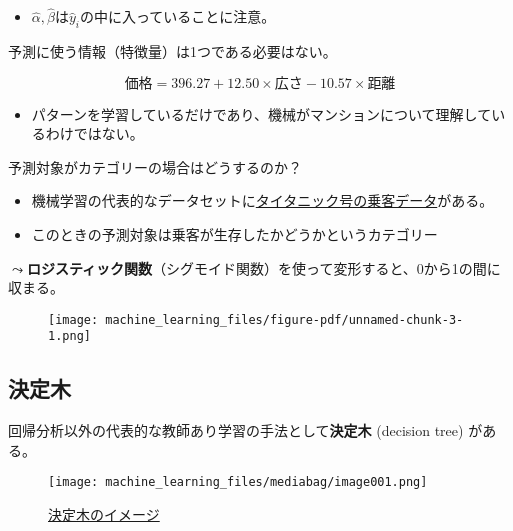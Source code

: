 \documentclass[
  xelatex,
  ja=standard]{bxjsarticle}
\providecommand{\tightlist}{%
  \setlength{\itemsep}{0pt}\setlength{\parskip}{0pt}}\usepackage{longtable,booktabs,array}
\begin{document}
\begin{itemize}
\tightlist
\item
  \(\hat{\alpha}, \hat{\beta}\)は\(\hat{y}_i\)の中に入っていることに注意。
\end{itemize}

予測に使う情報（特徴量）は1つである必要はない。

\[
\textrm{価格} = 396.27 + 12.50 \times \textrm{広さ} -10.57 \times \textrm{距離}
\]

\begin{itemize}
\tightlist
\item
  パターンを学習しているだけであり、機械がマンションについて理解しているわけではない。
\end{itemize}

予測対象がカテゴリーの場合はどうするのか？

\begin{itemize}
\tightlist
\item
  機械学習の代表的なデータセットに\href{https://www.kaggle.com/competitions/titanic}{タイタニック号の乗客データ}がある。
\item
  このときの予測対象は乗客が生存したかどうかというカテゴリー
\end{itemize}

\(\leadsto\)\textbf{ロジスティック関数}（シグモイド関数）を使って変形すると、0から1の間に収まる。

\begin{figure}[htpb]

{\centering \texttt{[image: machine\_learning\_files/figure-pdf/unnamed-chunk-3-1.png]}

}

\end{figure}

\hypertarget{ux6c7aux5b9aux6728}{%
\subsection{決定木}\label{ux6c7aux5b9aux6728}}

回帰分析以外の代表的な教師あり学習の手法として\textbf{決定木} (decision
tree) がある。

\begin{figure}[htpb]

{\centering \texttt{[image: machine\_learning\_files/mediabag/image001.png]}

}

\caption{\href{https://www.nttcoms.com/service/research/dataanalysis/decision-tree/}{決定木のイメージ}}

\end{figure}
\end{document}
